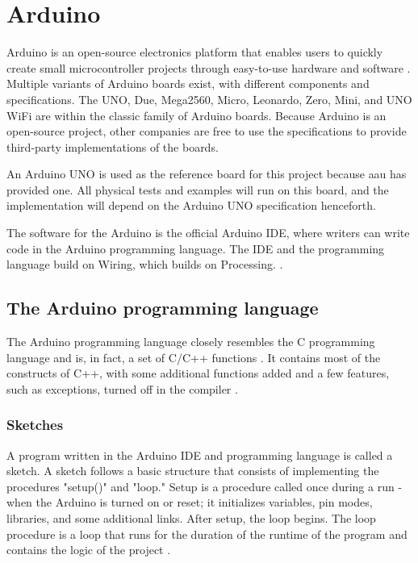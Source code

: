 \section{Arduino}\label{sec:arduino}
Arduino is an open-source electronics platform that enables users to quickly create small microcontroller projects through easy-to-use hardware and software \cite{WhatArduino}. Multiple variants of Arduino boards exist, with different components and specifications. The UNO, Due, Mega2560, Micro, Leonardo, Zero, Mini, and UNO WiFi are within the classic family of Arduino boards. Because Arduino is an open-source project, other companies are free to use the specifications to provide third-party implementations of the boards.

An Arduino UNO is used as the reference board for this project because \gls{aau} has provided one. All physical tests and examples will run on this board, and the implementation will depend on the Arduino UNO specification henceforth.

The software for the Arduino is the official Arduino IDE, where writers can write code in the Arduino programming language. The IDE and the programming language build on Wiring, which builds on Processing. \cite{WhatArduino,WiringOrg}.

\subsection{The Arduino programming language}\label{subsec:arduinoprogramminglanguage}
The Arduino programming language closely resembles the C programming language and is, in fact, a set of C/C++ functions \cite{ArduinoSupportC}. It contains most of the constructs of C++, with some additional functions added and a few features, such as exceptions, turned off in the compiler \cite{Nongnuorg}.

\subsubsection{Sketches}
A program written in the Arduino IDE and programming language is called a sketch. A sketch follows a basic structure that consists of implementing the procedures "setup()" and "loop." Setup is a procedure called once during a run - when the Arduino is turned on or reset; it initializes variables, pin modes, libraries, and some additional links. After setup, the loop begins. The loop procedure is a loop that runs for the duration of the runtime of the program and contains the logic of the project \cite{ArduinoLanguage}.

